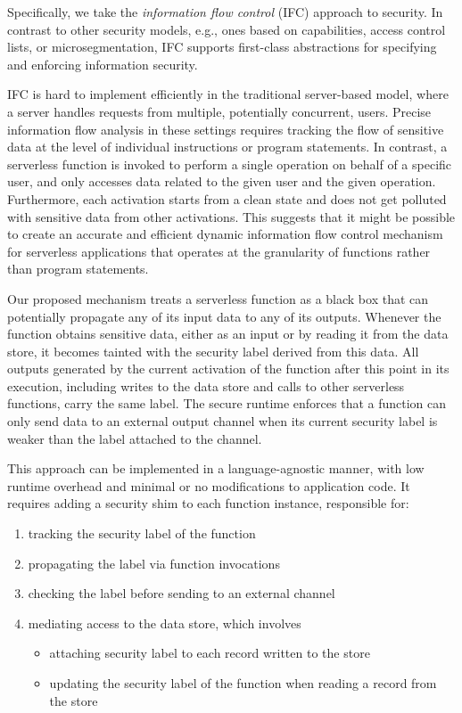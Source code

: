 \documentclass[acmsmall,10pt,review,anonymous]{acmart}\settopmatter{printfolios=true}
\begin{document}
Specifically, we take the \emph{information flow control} (IFC) 
approach to security. In contrast to other security models, e.g., ones 
based on capabilities, access control lists, or microsegmentation, IFC 
supports first-class abstractions for specifying and enforcing 
information security.

IFC is hard to implement efficiently in the traditional server-based 
model, where a server handles requests from multiple, potentially 
concurrent, users. Precise information flow analysis in these settings 
requires tracking the flow of sensitive data at the level of 
individual instructions or program statements.  In contrast, a 
serverless function is invoked to perform a single operation on behalf 
of a specific user, and only accesses data related to the given user 
and the given operation. Furthermore, each activation starts from a 
clean state and does not get polluted with sensitive data from other 
activations. This suggests that it might be possible to create an 
accurate and efficient dynamic information flow control mechanism for 
serverless applications that operates at the granularity of functions 
rather than program statements.

Our proposed mechanism treats a serverless function as a black box 
that can potentially propagate any of its input data to any of its 
outputs. Whenever the function obtains sensitive data, either as an 
input or by reading it from the data store, it becomes tainted with 
the security label derived from this data. All outputs generated by 
the current activation of the function after this point in its 
execution, including writes to the data store and calls to other 
serverless functions, carry the same label. The secure runtime 
enforces that a function can only send data to an external output 
channel when its current security label is weaker than the label 
attached to the channel.

This approach can be implemented in a language-agnostic manner, with 
low runtime overhead and minimal or no modifications to application 
code. It requires adding a security shim to each function instance, 
responsible for:

\begin{enumerate}
    \item tracking the security label of the function

    \item propagating the label via function invocations

    \item checking the label before sending to an external channel

    \item mediating access to the data store, which involves
        \begin{itemize}
            \item attaching security label to each record written to 
                the store
            \item updating the security label of the function when 
                reading a record from the store
        \end{itemize}
\end{enumerate}
\end{document}
